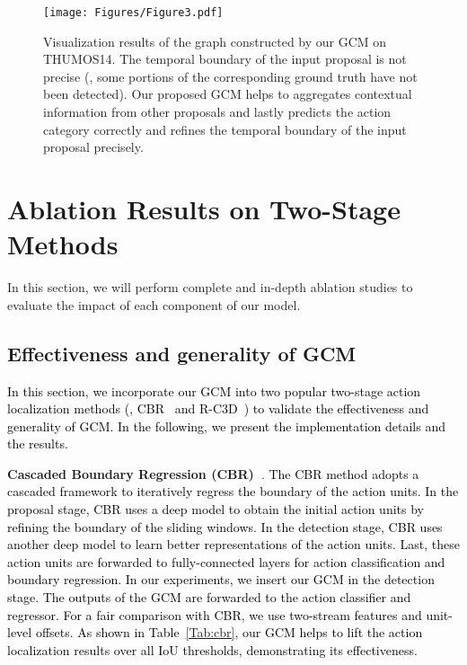 \documentclass[10pt,journal,compsoc]{IEEEtran}
\def\hao{\textcolor{black}}
\begin{document}
\begin{figure*}[!t]
	\centering
	\texttt{[image: Figures/Figure3.pdf]}
    \caption{Visualization results of the graph constructed by our GCM on THUMOS14. The temporal boundary of the input proposal is not precise (\ie, some portions of the corresponding ground truth have not been detected). Our proposed GCM helps to aggregates contextual information from other proposals and lastly predicts the action category correctly and refines the temporal boundary of the input proposal precisely.
    }
    \label{Fig:graph}
    \end{figure*}
	
	\section{Ablation Results on Two-Stage Methods}
	In this section, we will perform complete and in-depth ablation studies to evaluate the impact of each component of our model. 
	
	\subsection{Effectiveness and generality of GCM}
	
	\hao{In this section, we incorporate our GCM into two popular two-stage action localization methods (\ie, CBR~\cite{gao2017cascaded} and R-C3D~\cite{xu2017r}) to validate the effectiveness and generality of GCM. In the following, we present the implementation details and the results.}
	
	\noindent \textbf{Cascaded Boundary Regression (CBR)~\cite{gao2017cascaded}}. \hao{The CBR method adopts a cascaded framework to iteratively regress the boundary of the action units. In the proposal stage, CBR uses a deep model to obtain the initial action units by refining the boundary of the sliding windows. In the detection stage, CBR uses another deep model to learn better representations of the action units. Last, these action units are forwarded to fully-connected layers for action classification and boundary regression. In our experiments, we insert our GCM in the detection stage. The outputs of the GCM are forwarded to the action classifier and regressor.
		For a fair comparison with CBR, we use two-stream features and unit-level offsets. As shown in Table~\ref{Tab:cbr}, our GCM helps to lift the action localization results over all IoU thresholds, demonstrating its effectiveness.}
	
\end{document}

